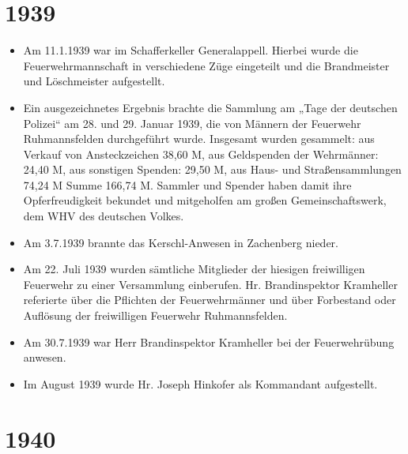 \documentclass[12pt,a4paper]{book}
\begin{document}
\section*{1939}

\begin{itemize}
\item Am 11.1.1939 war im Schafferkeller Generalappell. Hierbei wurde
die Feuerwehrmannschaft in verschiedene Züge eingeteilt und die
Brandmeister und Löschmeister aufgestellt.

\item Ein ausgezeichnetes Ergebnis brachte die Sammlung am „Tage der
deutschen Polizei“ am 28. und 29. Januar 1939, die von Männern der
Feuerwehr Ruhmannsfelden durchgeführt wurde. Insgesamt wurden gesammelt:
aus Verkauf von Ansteckzeichen 38,60 M, aus Geldspenden der Wehrmänner:
24,40 M, aus sonstigen Spenden: 29,50 M, aus Haus- und Straßensammlungen
74,24 M Summe 166,74 M. Sammler und Spender haben damit ihre
Opferfreudigkeit bekundet und mitgeholfen am großen Gemeinschaftswerk,
dem WHV des deutschen Volkes.

\item Am 3.7.1939 brannte das Kerschl-Anwesen in Zachenberg nieder.

\item Am 22. Juli 1939 wurden sämtliche Mitglieder der hiesigen
freiwilligen Feuerwehr zu einer Versammlung einberufen. Hr.
Brandinspektor Kramheller referierte über die Pflichten der
Feuerwehrmänner und über Forbestand oder Auflösung der freiwilligen
Feuerwehr Ruhmannsfelden.

\item Am 30.7.1939 war Herr Brandinspektor Kramheller bei der
Feuerwehrübung anwesen.

\item Im August 1939 wurde Hr. Joseph Hinkofer als Kommandant
aufgestellt.
\end{itemize}

\section*{1940}
\end{document}
